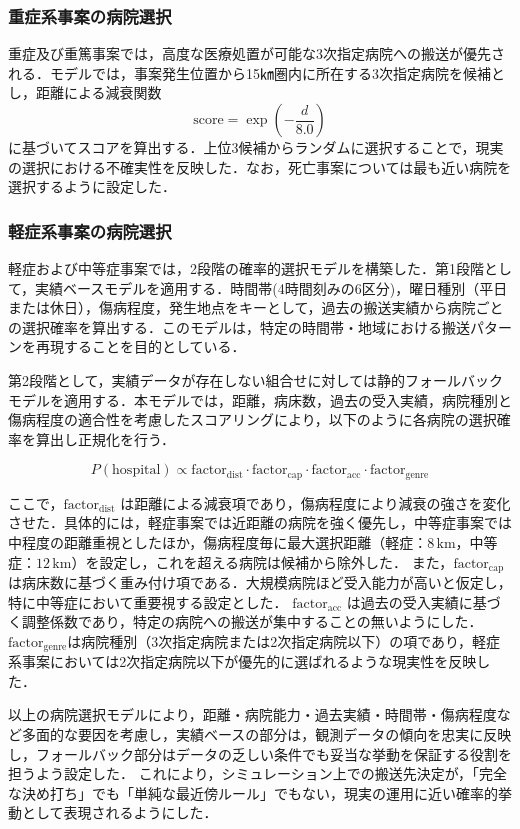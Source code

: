 \subsubsection{重症系事案の病院選択}
重症及び重篤事案では，高度な医療処置が可能な3次指定病院への搬送が優先される．モデルでは，事案発生位置から15㎞圏内に所在する3次指定病院を候補とし，距離による減衰関数
\[
  \mathrm{score} = \exp\left( -\frac{d}{8.0} \right)
\]
に基づいてスコアを算出する．上位3候補からランダムに選択することで，現実の選択における不確実性を反映した．なお，死亡事案については最も近い病院を選択するように設定した．

\subsubsection{軽症系事案の病院選択}
軽症および中等症事案では，2段階の確率的選択モデルを構築した．第1段階として，実績ベースモデルを適用する．時間帯(4時間刻みの6区分)，曜日種別（平日または休日），傷病程度，発生地点をキーとして，過去の搬送実績から病院ごとの選択確率を算出する．このモデルは，特定の時間帯・地域における搬送パターンを再現することを目的としている．

第2段階として，実績データが存在しない組合せに対しては静的フォールバックモデルを適用する．本モデルでは，距離，病床数，過去の受入実績，病院種別と傷病程度の適合性を考慮したスコアリングにより，以下のように各病院の選択確率を算出し正規化を行う．

\[
  P(\mathrm{hospital}) \propto \mathrm{factor}_{\mathrm{dist}} \cdot \mathrm{factor}_{\mathrm{cap}} \cdot \mathrm{factor}_{\mathrm{acc}} \cdot \mathrm{factor}_{\mathrm{genre}}
\]

ここで，$\mathrm{factor}_{\mathrm{dist}}$ は距離による減衰項であり，傷病程度により減衰の強さを変化させた．具体的には，軽症事案では近距離の病院を強く優先し，中等症事案では中程度の距離重視としたほか，傷病程度毎に最大選択距離（軽症：$8\,\mathrm{km}$，中等症：$12\,\mathrm{km}$）を設定し，これを超える病院は候補から除外した．
また，$\mathrm{factor}_{\mathrm{cap}}$ は病床数に基づく重み付け項である．大規模病院ほど受入能力が高いと仮定し，特に中等症において重要視する設定とした．
$\mathrm{factor}_{\mathrm{acc}}$ は過去の受入実績に基づく調整係数であり，特定の病院への搬送が集中することの無いようにした．
$\mathrm{factor}_{\mathrm{genre}}$は病院種別（3次指定病院または2次指定病院以下）の項であり，軽症系事案においては2次指定病院以下が優先的に選ばれるような現実性を反映した．

以上の病院選択モデルにより，距離・病院能力・過去実績・時間帯・傷病程度など多面的な要因を考慮し，実績ベースの部分は，観測データの傾向を忠実に反映し，フォールバック部分はデータの乏しい条件でも妥当な挙動を保証する役割を担うよう設定した．
これにより，シミュレーション上での搬送先決定が，「完全な決め打ち」でも「単純な最近傍ルール」でもない，現実の運用に近い確率的挙動として表現されるようにした．
\clearpage


